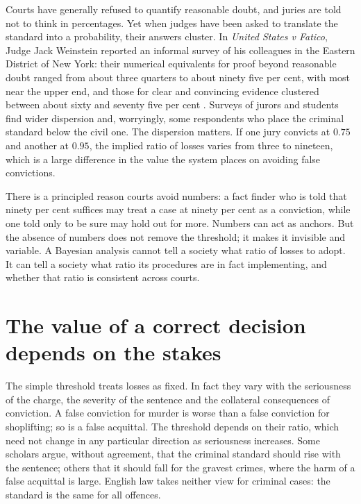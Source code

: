 Courts have generally refused to quantify reasonable doubt, and juries are told not to think in percentages. Yet when judges have been asked to translate the standard into a probability, their answers cluster. In \emph{United States v Fatico}, Judge Jack Weinstein reported an informal survey of his colleagues in the Eastern District of New York: their numerical equivalents for proof beyond reasonable doubt ranged from about three quarters to about ninety five per cent, with most near the upper end, and those for clear and convincing evidence clustered between about sixty and seventy five per cent \citep{fatico1978}. Surveys of jurors and students find wider dispersion and, worryingly, some respondents who place the criminal standard below the civil one. The dispersion matters. If one jury convicts at $0.75$ and another at $0.95$, the implied ratio of losses varies from three to nineteen, which is a large difference in the value the system places on avoiding false convictions.

There is a principled reason courts avoid numbers: a fact finder who is told that ninety per cent suffices may treat a case at ninety per cent as a conviction, while one told only to be sure may hold out for more. Numbers can act as anchors. But the absence of numbers does not remove the threshold; it makes it invisible and variable. A Bayesian analysis cannot tell a society what ratio of losses to adopt. It can tell a society what ratio its procedures are in fact implementing, and whether that ratio is consistent across courts.

\section{The value of a correct decision depends on the stakes}

The simple threshold treats losses as fixed. In fact they vary with the seriousness of the charge, the severity of the sentence and the collateral consequences of conviction. A false conviction for murder is worse than a false conviction for shoplifting; so is a false acquittal. The threshold depends on their ratio, which need not change in any particular direction as seriousness increases. Some scholars argue, without agreement, that the criminal standard should rise with the sentence; others that it should fall for the gravest crimes, where the harm of a false acquittal is large. English law takes neither view for criminal cases: the standard is the same for all offences.

